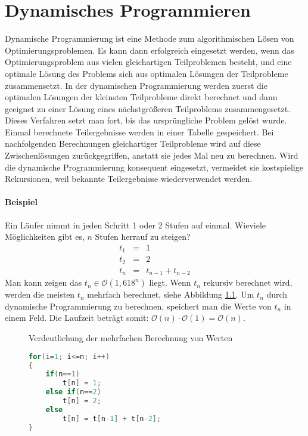 \chapter{Dynamisches Programmieren}
Dynamische Programmierung ist eine Methode zum algorithmischen Lösen von Optimierungsproblemen.
Es kann dann erfolgreich eingesetzt werden, wenn das Optimierungsproblem aus vielen gleichartigen Teilproblemen besteht,
und eine optimale Lösung des Problems sich aus optimalen Lösungen der Teilprobleme zusammensetzt.
In der dynamischen Programmierung werden zuerst die optimalen Lösungen der kleinsten Teilprobleme direkt berechnet und dann geeignet zu einer Lösung eines nächstgrößeren Teilproblems zusammengesetzt.
Dieses Verfahren setzt man fort, bis das ursprüngliche Problem gelöst wurde.
Einmal berechnete Teilergebnisse werden in einer Tabelle gespeichert.
Bei nachfolgenden Berechnungen gleichartiger Teilprobleme wird auf diese Zwischenlösungen zurückgegriffen, anstatt sie jedes Mal neu zu berechnen.
Wird die dynamische Programmierung konsequent eingesetzt, vermeidet sie kostspielige Rekursionen, weil bekannte Teilergebnisse wiederverwendet werden.

\subsubsection{Beispiel}
Ein Läufer nimmt in jeden Schritt 1 oder 2 Stufen auf einmal.
Wieviele Möglichkeiten gibt es, \(n\) Stufen herrauf zu steigen?
\begin{eqnarray*}
t_{1} &=& 1\\
t_{2} &=& 2\\
t_{n} &=& t_{n-1} + t_{n-2}
\end{eqnarray*}
Man kann zeigen das \(t_{n} \in \mathcal{O}(1,618^{n})\) liegt.
Wenn \(t_{n}\) rekursiv berechnet wird, werden die meisten \(t_{n}\) mehrfach berechnet, siehe Abbildung \ref{fig:ProgLaufer}.
Um \(t_{n}\) durch dynamische Programmierung zu berechnen, speichert man die Werte von \(t_{n}\) in einem Feld.
Die Laufzeit beträgt somit: \(\mathcal{O}(n)\cdot\mathcal{O}(1) = \mathcal{O}(n)\).
\newpage
\begin{figure}[htbp]
	\begin{center}
	\end{center}
	\caption{Verdeutlichung der mehrfachen Berechnung von Werten}
	\label{fig:ProgLaufer}
\end{figure}
\begin{figure}[htbp]
\begin{lstlisting}[language=java, caption={Beispielimplementierung in Java}]
for(i=1; i<=n; i++)
{
	if(n==1)
		t[n] = 1;
	else if(n==2)
		t[n] = 2;
	else
		t[n] = t[n-1] + t[n-2];
}
\end{lstlisting}
\end{figure}

